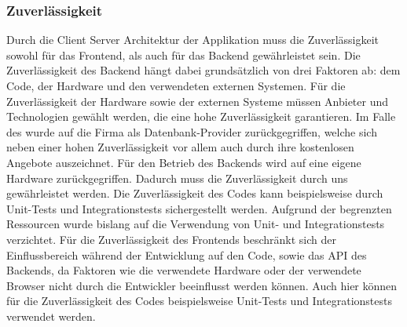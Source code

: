 \subsubsection{Zuverlässigkeit}
Durch die Client Server Architektur der Applikation muss die Zuverlässigkeit sowohl für das Frontend, als auch für das Backend gewährleistet sein.
Die Zuverlässigkeit des Backend hängt dabei grundsätzlich von drei Faktoren ab: dem Code, der Hardware und den verwendeten externen Systemen.
Für die Zuverlässigkeit der Hardware sowie der externen Systeme müssen Anbieter und Technologien gewählt werden, die eine hohe Zuverlässigkeit garantieren.
Im Falle des  wurde auf die Firma  als Datenbank-Provider zurückgegriffen, welche sich neben einer hohen Zuverlässigkeit vor allem auch durch ihre kostenlosen Angebote auszeichnet.
Für den Betrieb des Backends wird auf eine eigene Hardware zurückgegriffen.
Dadurch muss die Zuverlässigkeit durch uns gewährleistet werden.
Die Zuverlässigkeit des Codes kann beispielsweise durch Unit-Tests und Integrationstests sichergestellt werden.
Aufgrund der begrenzten Ressourcen wurde bislang auf die Verwendung von Unit- und Integrationstests verzichtet.
\newparagraph
Für die Zuverlässigkeit des Frontends beschränkt sich der Einflussbereich während der Entwicklung auf den Code, sowie das \ac{API} des Backends, da Faktoren wie die verwendete Hardware oder der verwendete Browser nicht durch die Entwickler beeinflusst werden können.
Auch hier können für die Zuverlässigkeit des Codes beispielsweise Unit-Tests und Integrationstests verwendet werden.

